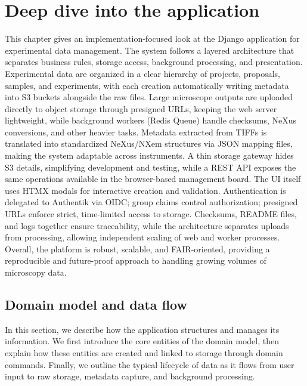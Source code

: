 \chapter{Deep dive into the application}\label{chap:deep-dive-app}

This chapter gives an implementation-focused look at the Django application for experimental data management.  
The system follows a layered architecture that separates business rules, storage access, background processing, and presentation.  
Experimental data are organized in a clear hierarchy of projects, proposals, samples, and experiments, with each creation 
automatically writing metadata into S3 buckets alongside the raw files.  
Large microscope outputs are uploaded directly to object storage through presigned URLs, keeping the web server lightweight, 
while background workers (Redis Queue) handle checksums, NeXus conversions, and other heavier tasks.  
Metadata extracted from TIFFs is translated into standardized NeXus/NXem structures via JSON mapping files, 
making the system adaptable across instruments.  
A thin storage gateway hides S3 details, simplifying development and testing, while a REST API exposes the same operations 
available in the browser-based management board. The UI itself uses HTMX modals for interactive creation and validation.  
Authentication is delegated to Authentik via OIDC; group claims control authorization; presigned URLs enforce strict, 
time-limited access to storage.  
Checksums, README files, and logs together ensure traceability, while the architecture separates uploads from processing, 
allowing independent scaling of web and worker processes.  
Overall, the platform is robust, scalable, and FAIR-oriented, providing a reproducible and future-proof approach to handling 
growing volumes of microscopy data.


\section{Domain model and data flow}\label{sec:domain-dataflow}

In this section, we describe how the application structures and manages 
its information. We first introduce the core entities of the domain model, 
then explain how these entities are created and linked to storage through 
domain commands. Finally, we outline the typical lifecycle of data as it 
flows from user input to raw storage, metadata capture, and background 
processing.

